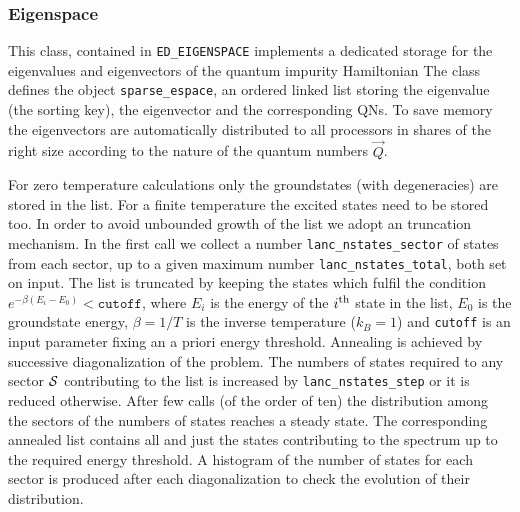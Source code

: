 \documentclass[final,3p,10pt]{elsarticle}
\begin{document}
\subsubsection{Eigenspace}\label{CodeEigenspace}
This class, contained in \texttt{ED\_EIGENSPACE} implements a
dedicated storage for the eigenvalues and eigenvectors of the quantum impurity Hamiltonian
The class defines the object \texttt{sparse\_espace}, an  
ordered linked list storing the eigenvalue (the sorting key), the
eigenvector and the corresponding QNs. To save memory the eigenvectors
are automatically distributed to all processors in shares of the right
size according to the nature of the quantum numbers $\vec{Q}$. 

For zero temperature calculations only the groundstates (with degeneracies) are stored
in the list.
For a finite temperature the excited states need to be stored too.
In order to avoid unbounded growth of the list we adopt an 
truncation mechanism. In the first call we collect a number 
\texttt{lanc\_nstates\_sector} of states from each sector, up to a
given maximum number \texttt{lanc\_nstates\_total}, both set on input.  
The list is truncated by keeping the states which
fulfil the condition $e^{-\beta(E_i-E_0)} < \mathtt{cutoff}$, where
$E_i$ is the energy of the $i^{\rm th}$ state in the list, $E_0$ is the
groundstate energy,  $\beta=1/T$ is the inverse temperature ($k_B=1$) and \texttt{cutoff}
is an input parameter fixing an a priori energy threshold.
%  
Annealing is achieved by successive diagonalization of the problem.
The numbers of states required to any sector ${\cal S}$ contributing to the list is increased by
\texttt{lanc\_nstates\_step} or it is reduced otherwise. After few calls
(of the order of ten) the distribution among the sectors of the
numbers of states reaches a steady state.
The corresponding annealed list contains all and just the states
contributing to the spectrum up to the required energy threshold.
A histogram of the number of states for each sector is produced after
each diagonalization to check the evolution of their distribution.
\end{document}
